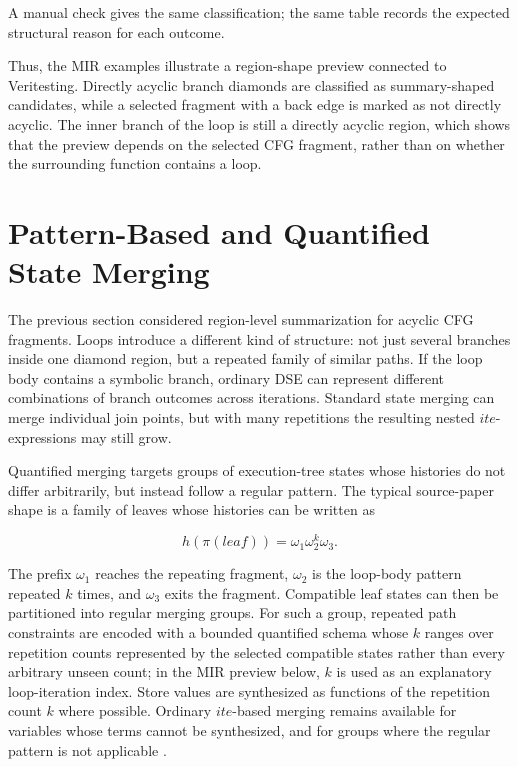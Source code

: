 \documentclass[conference]{IEEEtran}
\newcommand{\ite}{\mathit{ite}}
\begin{document}
A manual check gives the same classification; the same table records the
expected structural reason for each outcome.

Thus, the MIR examples illustrate a region-shape preview connected to
Veritesting. Directly acyclic branch diamonds are classified as summary-shaped
candidates, while a selected fragment with a back edge is marked as not
directly acyclic. The inner branch of the loop is still a directly acyclic
region, which shows that the preview depends on the selected CFG fragment,
rather than on whether the surrounding function contains a loop.

\section{Pattern-Based and Quantified State Merging}
\label{sec:quantified}

The previous section considered region-level summarization for acyclic CFG
fragments. Loops introduce a different kind of structure: not just several
branches inside one diamond region, but a repeated family of similar paths. If
the loop body contains a symbolic branch, ordinary DSE can represent different
combinations of branch outcomes across iterations. Standard state merging can
merge individual join points, but with many repetitions the resulting nested
\(\ite\)-expressions may still grow.

Quantified merging targets groups of execution-tree states whose histories do
not differ arbitrarily, but instead follow a regular pattern. The typical
source-paper shape is a family of leaves whose histories can be written as

\[
h(\pi(\mathit{leaf})) = \omega_1\omega_2^k\omega_3.
\]

The prefix \(\omega_1\) reaches the repeating fragment, \(\omega_2\) is the
loop-body pattern repeated \(k\) times, and \(\omega_3\) exits the fragment.
Compatible leaf states can then be partitioned into regular merging groups.
For such a group, repeated path constraints are encoded with a bounded
quantified schema whose \(k\) ranges over repetition counts represented by the
selected compatible states rather than every arbitrary unseen count; in the MIR
preview below, \(k\) is used as an explanatory loop-iteration index. Store
values are synthesized as functions of the repetition count \(k\) where
possible. Ordinary \(\ite\)-based merging remains available for variables whose
terms cannot be synthesized, and for groups where the regular pattern is not
applicable \cite{quantified-merging}.
\end{document}

